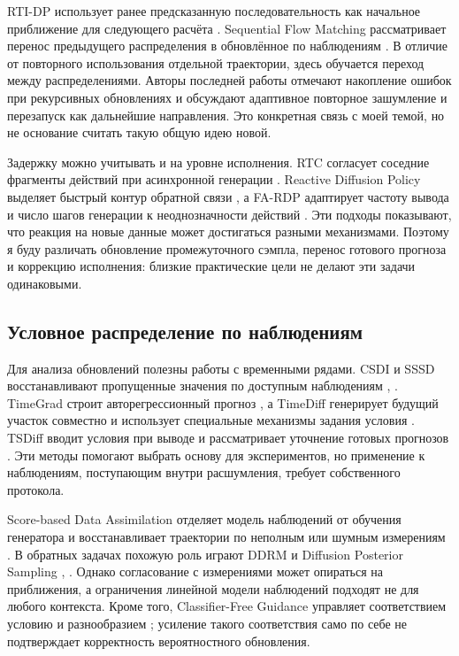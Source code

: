 RTI-DP использует ранее предсказанную последовательность как начальное приближение для следующего расчёта \citep{p04}. Sequential Flow Matching рассматривает перенос предыдущего распределения в обновлённое по наблюдениям \citep{p03}. В отличие от повторного использования отдельной траектории, здесь обучается переход между распределениями. Авторы последней работы отмечают накопление ошибок при рекурсивных обновлениях и обсуждают адаптивное повторное зашумление и перезапуск как дальнейшие направления. Это конкретная связь с моей темой, но не основание считать такую общую идею новой.

Задержку можно учитывать и на уровне исполнения. RTC согласует соседние фрагменты действий при асинхронной генерации \citep{p06}. Reactive Diffusion Policy выделяет быстрый контур обратной связи \citep{p07}, а FA-RDP адаптирует частоту вывода и число шагов генерации к неоднозначности действий \citep{p08}. Эти подходы показывают, что реакция на новые данные может достигаться разными механизмами. Поэтому я буду различать обновление промежуточного сэмпла, перенос готового прогноза и коррекцию исполнения: близкие практические цели не делают эти задачи одинаковыми.

\subsection{Условное распределение по наблюдениям}

Для анализа обновлений полезны работы с временными рядами. CSDI и SSSD восстанавливают пропущенные значения по доступным наблюдениям \citep{p19}, \citep{p23}. TimeGrad строит авторегрессионный прогноз \citep{p20}, а TimeDiff генерирует будущий участок совместно и использует специальные механизмы задания условия \citep{p21}. TSDiff вводит условия при выводе и рассматривает уточнение готовых прогнозов \citep{p24}. Эти методы помогают выбрать основу для экспериментов, но применение к наблюдениям, поступающим внутри расшумления, требует собственного протокола.

Score-based Data Assimilation отделяет модель наблюдений от обучения генератора и восстанавливает траектории по неполным или шумным измерениям \citep{p22}. В обратных задачах похожую роль играют DDRM и Diffusion Posterior Sampling \citep{p29}, \citep{p28}. Однако согласование с измерениями может опираться на приближения, а ограничения линейной модели наблюдений подходят не для любого контекста. Кроме того, Classifier-Free Guidance управляет соответствием условию и разнообразием \citep{p40}; усиление такого соответствия само по себе не подтверждает корректность вероятностного обновления.


